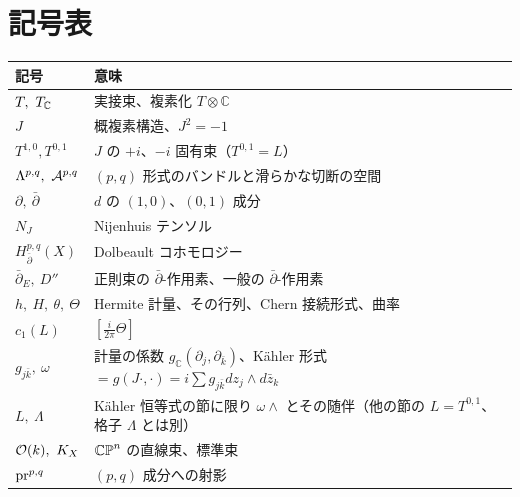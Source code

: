 \section*{記号表}
\begin{longtable}{p{}p{}}
\toprule
記号 & 意味\\
\midrule
$T,\ \Tc$ & 実接束、複素化 $T\otimes\mathbb C$\\
$J$ & 概複素構造、$J^2=-1$\\
$T^{1,0},T^{0,1}$ & $J$ の $+i$、$-i$ 固有束（$T^{0,1}=L$）\\
$\Lam^{p,q},\ \A^{p,q}$ & $(p,q)$ 形式のバンドルと滑らかな切断の空間\\
$\partial,\ \bar\partial$ & $d$ の $(1,0)$、$(0,1)$ 成分\\
$N_J$ & Nijenhuis テンソル\\
$H^{p,q}_{\bar\partial}(X)$ & Dolbeault コホモロジー\\
$\bar\partial_E,\ D''$ & 正則束の $\bar\partial$-作用素、一般の $\bar\partial$-作用素\\
$h,\ H,\ \theta,\ \Theta$ & Hermite 計量、その行列、Chern 接続形式、曲率\\
$c_1(L)$ & $[\frac i{2\pi}\Theta]$\\
$g_{j\bar k},\ \omega$ & 計量の係数 $g_{\mathbb C}(\partial_j,\partial_{\bar k})$、Kähler 形式 $=g(J\cdot,\cdot)=i\sum g_{j\bar k}dz_j\wedge d\bar z_k$\\
$L,\ \Lambda$ & Kähler 恒等式の節に限り $\omega\wedge$ とその随伴（他の節の $L=T^{0,1}$、格子 $\Lambda$ とは別）\\
$\Oc(k),\ K_X$ & $\mathbb{CP}^n$ の直線束、標準束\\
$\mathrm{pr}^{p,q}$ & $(p,q)$ 成分への射影\\
\bottomrule
\end{longtable}


